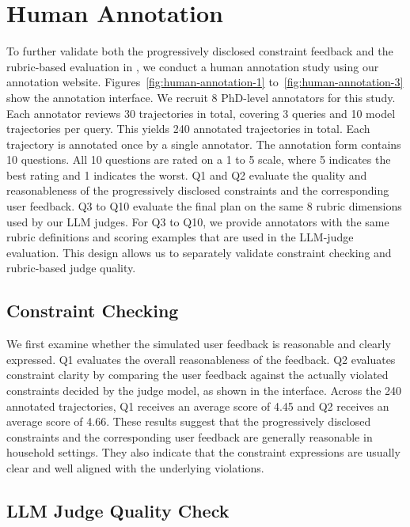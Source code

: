\section{Human Annotation}
\label{app:human-annotation}

To further validate both the progressively disclosed constraint feedback and the rubric-based evaluation in \bench{}, we conduct a human annotation study using our annotation website.
Figures~\ref{fig:human-annotation-1} to~\ref{fig:human-annotation-3} show the annotation interface.
We recruit 8 PhD-level annotators for this study.
Each annotator reviews 30 trajectories in total, covering 3 queries and 10 model trajectories per query.
This yields 240 annotated trajectories in total.
Each trajectory is annotated once by a single annotator.
The annotation form contains 10 questions.
All 10 questions are rated on a 1 to 5 scale, where 5 indicates the best rating and 1 indicates the worst.
Q1 and Q2 evaluate the quality and reasonableness of the progressively disclosed constraints and the corresponding user feedback.
Q3 to Q10 evaluate the final plan on the same 8 rubric dimensions used by our LLM judges.
For Q3 to Q10, we provide annotators with the same rubric definitions and scoring examples that are used in the LLM-judge evaluation.
This design allows us to separately validate constraint checking and rubric-based judge quality.

\subsection{Constraint Checking}
\label{app:human-annotation-constraint-checking}

We first examine whether the simulated user feedback is reasonable and clearly expressed.
Q1 evaluates the overall reasonableness of the feedback.
Q2 evaluates constraint clarity by comparing the user feedback against the actually violated constraints decided by the judge model, as shown in the interface.
Across the 240 annotated trajectories, Q1 receives an average score of 4.45 and Q2 receives an average score of 4.66.
These results suggest that the progressively disclosed constraints and the corresponding user feedback are generally reasonable in household settings.
They also indicate that the constraint expressions are usually clear and well aligned with the underlying violations.

\subsection{LLM Judge Quality Check}
\label{app:human-annotation-llm-judge-check}

